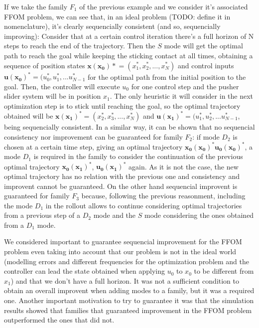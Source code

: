 \documentclass[12,twoside]{TFG-GM}
\theoremstyle{definition}
\theoremstyle{remark}
\begin{document}
If we take the family $F_1$ of the previous example and we consider it's associated FFOM problem, we can see that, in an ideal problem (TODO: define it in nomenclature), it's clearly sequencially consistent (and so, sequencially improving): Consider that at a certain control iteration there's a full horizon of N steps to reach the end of the trajectory. Then the $S$ mode will get the optimal path to reach the goal while keeping the sticking contact at all times, obtaining a sequence of position states $\boldsymbol{x(x_0)*} = (x_1^*, x_2^*, ..., x_N^*)$ and control inputs $\boldsymbol{u(x_0)^*} = (u_0^*, u_1^*, ... u_{N-1}^*$ for the optimal path from the initial position to the goal. Then, the controller will execute $u_0$ for one control step and the pusher slider system will be in position $x_1$. The only heuristic it will consider in the next optimization step is to stick until reaching the goal, so the optimal trajectory obtained will be $\boldsymbol{x(x_1)^*} = (x_2^*, x_3^*, ..., x_N^*)$ and $\boldsymbol{u(x_1)^*} = (u_1^*, u_2^*, ... u_{N-1}^*$, being sequencially consistent. In a similar way, it can be shown that no sequencial consistency nor improvement can be guaranteed for family $F_2$: if mode $D_2$ is chosen at a certain time step, giving an optimal trajectory $\boldsymbol{x_0(x_0)^*} \boldsymbol{u_0(x_0)^*}$, a mode $D_1$ is required in the family to consider the continuation of the previous optimal trajectory $\boldsymbol{x_0(x_1)^*}$,  $\boldsymbol{u_0(x_1)^*}$ again. As it is not the case, the new optimal trajectory has no relation with the previous one and consistency and improvent cannot be guaranteed. On the other hand sequencial improvent is guaranteed for family $F_3$ because, following the previous reasonment, including the mode $D_1$ in the rollout allows to continue considering optimal trajectories from a previous step of a $D_2$ mode and the $S$ mode considering the ones obtained from a $D_1$ mode.

We considered important to guarantee sequencial improvement for the FFOM problem even taking into account that our problem is not in the ideal world (modelling errors and different frequencies for the optimization problem and the controller can lead the state obtained when applying $u_0$ to $x_0$ to be different from $x_1$) and that we don't have a full horizon. It was not a sufficient condition to obtain an overall improvent when adding modes to a family, but it was a required one. Another important motivation to try to guarantee it was that the simulation results showed that families that guaranteed improvement in the FFOM problem outperformed the ones that did not.
\end{document}
